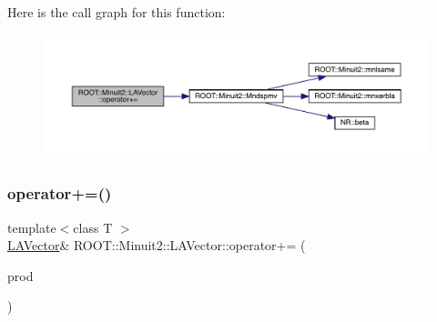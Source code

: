 Here is the call graph for this function\+:
\nopagebreak
\begin{figure}[H]
\begin{center}
\leavevmode
\includegraphics[width=350pt]{d3/d20/classROOT_1_1Minuit2_1_1LAVector_a4372064902da0f6b7028c1da17612825_cgraph}
\end{center}
\end{figure}
\mbox{\label{classROOT_1_1Minuit2_1_1LAVector_a4372064902da0f6b7028c1da17612825}} 
\subsubsection{\texorpdfstring{operator+=()}{operator+=()}\hspace{0.1cm}{\footnotesize\ttfamily [8/8]}}
{\footnotesize\ttfamily template$<$class T $>$ \\
\mbox{\hyperlink{classROOT_1_1Minuit2_1_1LAVector}{L\+A\+Vector}}\& R\+O\+O\+T\+::\+Minuit2\+::\+L\+A\+Vector\+::operator+= (\begin{DoxyParamCaption}\item[{const \mbox{\hyperlink{classROOT_1_1Minuit2_1_1ABObj}{A\+B\+Obj}}$<$ \mbox{\hyperlink{classROOT_1_1Minuit2_1_1vec}{vec}}, \mbox{\hyperlink{classROOT_1_1Minuit2_1_1ABProd}{A\+B\+Prod}}$<$ \mbox{\hyperlink{classROOT_1_1Minuit2_1_1ABObj}{A\+B\+Obj}}$<$ \mbox{\hyperlink{classROOT_1_1Minuit2_1_1sym}{sym}}, \mbox{\hyperlink{classROOT_1_1Minuit2_1_1LASymMatrix}{L\+A\+Sym\+Matrix}}, T $>$, \mbox{\hyperlink{classROOT_1_1Minuit2_1_1ABObj}{A\+B\+Obj}}$<$ \mbox{\hyperlink{classROOT_1_1Minuit2_1_1vec}{vec}}, \mbox{\hyperlink{classROOT_1_1Minuit2_1_1LAVector}{L\+A\+Vector}}, T $>$ $>$, T $>$ \&}]{prod }\end{DoxyParamCaption})\hspace{0.3cm}{\ttfamily [inline]}}

